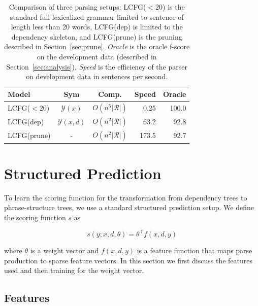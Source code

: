 \documentclass[11pt,letterpaper]{article}
\newcommand{\rules}{\mathcal{R}}
\begin{document}


\begin{table}
  \centering
  \small
  \hspace*{-0.3cm}
  \begin{tabular}{|l|ccrr|}
    \hline
    Model & Sym & Comp. & Speed & Oracle  \\
    \hline
    \hline
    LCFG($< 20$)  & $\mathcal{Y}(x)$ & $O(n^5|\rules|)$ &     0.25 & 100.0  \\
    LCFG(dep)    & $\mathcal{Y}(x,d)$ & $O(n^2|\rules|)$ &  63.2 & 92.8    \\
    LCFG(prune)  &  - & $O(n^2|\rules|)$ &   173.5 & 92.7 \\
    \hline
  \end{tabular}
  \label{tab:alg-oracle}
  \caption{Comparison of three parsing setups:
    LCFG($<20$) is the standard full lexicalized grammar limited to sentence of length
    less than 20 words, LCFG(dep) is
    limited to the dependency skeleton, and LCFG(prune) is the pruning described in
    Section~\ref{sec:prune}. \textit{Oracle} is the oracle f-score on the development data (described in Section~\ref{sec:analysis}). \textit{Speed} is the efficiency of the parser on development data in sentences per second.}
\end{table}


\section{Structured Prediction}

To learn the scoring function for the transformation from dependency trees to phrase-structure trees,
we use a standard structured prediction setup.
We define the scoring function $s$ as

\[s(y;x, d, \theta) =  \theta^{\top} f(x, d, y) \]

\noindent
where $\theta$ is a weight vector  and $f(x, d, y)$ is a feature function that maps parse production to sparse feature vectors. In this section we first discuss the features used and then training for the weight vector.


\subsection{Features}
\end{document}
